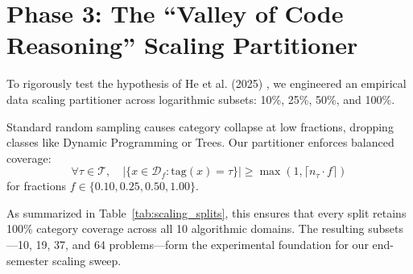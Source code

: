 \documentclass[journal]{IEEEtran}
\begin{document}
\section{Phase 3: The ``Valley of Code Reasoning'' Scaling Partitioner}
\label{sec:scaling}
To rigorously test the hypothesis of He et al. (2025) \cite{he2025valley}, we engineered an empirical data scaling partitioner across logarithmic subsets: 10\%, 25\%, 50\%, and 100\%.

Standard random sampling causes category collapse at low fractions, dropping classes like Dynamic Programming or Trees. Our partitioner enforces balanced coverage:
\begin{equation}
\forall \tau \in \mathcal{T}, \quad \left| \{x \in \mathcal{D}_f : \text{tag}(x) = \tau\} \right| \ge \max\left(1, \lceil n_\tau \cdot f \rceil\right)
\end{equation}
for fractions $f \in \{0.10, 0.25, 0.50, 1.00\}$.

\begin{table}[!t]
\caption{Stratified Data Partitions for Empirical Reasoning Valley Sweep}
\label{tab:scaling_splits}
\centering
{}
\end{table}

As summarized in Table~\ref{tab:scaling_splits}, this ensures that every split retains 100\% category coverage across all 10 algorithmic domains. The resulting subsets---10, 19, 37, and 64 problems---form the experimental foundation for our end-semester scaling sweep.

\end{document}
